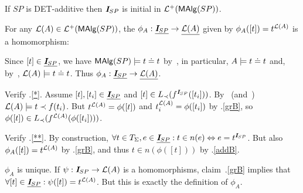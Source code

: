 \documentclass[12pt]{article}
\begin{document}
\begin{Prop}
If $SP$ is DET-additive then $\mbox{\bf{\em I}}_{SP}$ is initial in ${\cal L}^+({\sf MAlg}(SP))$.
\end{Prop}
\begin{Proof}
For any ${\cal L}(A)\in{\cal L}^+({\sf MAlg}(SP))$, the $\phi_A: \underline {\mbox{\bf{\em I}}_{SP}}\rightarrow \underline {{\cal L}(A)}$ given by $\phi_A([t]) = t^{{\cal L}(A)}$ is a homomorphism:
\begin{enum}
\item
Since $[t]\in\underline {\mbox{\bf{\em I}}_{SP}}$, we have ${\sf MAlg}(SP)\models t\mathrel{\dot{=} } t$ by~, in
particular, $A\models t\mathrel{\dot{=} } t$ and, by~, ${\cal L}(A)\models
t\mathrel{\dot{=} } t$. Thus $\phi_A:\underline {\mbox{\bf{\em I}}_{SP}}\rightarrow \underline {{\cal L}(A)}$.
\item
Verify .\ref{*}. Assume $[t],[t_i]\in\underline {\mbox{\bf{\em I}}_{SP}}$ and
$[t]\in L_{\prec}(f^{{\scriptsize{\mbox{\bf{\em I}}}}_{SP}}([t_i]))$. By~ (and~)
${\cal L}(A)\models t\prec f(t_i)$. But $t^{{\cal L}(A)}= \phi([t])$ and $t_i^{{\cal L}(A)}= \phi([t_i])$ by .\ref{grB}, so $\phi([t])\in L_{\prec}(f^{{\cal L}(A)}(\phi([t_i])))$. 
\item
Verify .\ref{**}. By construction, $\forall t\in T_{\Sigma}, e\in
\underline {\mbox{\bf{\em I}}_{SP}}: t\in n(e) \Leftrightarrow e = t^{{\scriptsize{\mbox{\bf{\em I}}}}_{SP}}$. But also
$\phi_A([t]) = t^{{\cal L}(A)}$ by .\ref{grB}, and thus $t\in
n(\phi([t]))$ by .\ref{addB}.
\end{enum}
$\phi_A$ is unique. If $\psi:\mbox{\bf{\em I}}_{SP}\rightarrow {\cal L}(A)$ is a homomorphisms,
claim~.\ref{grB} implies that $\forall [t]\in\underline {\mbox{\bf{\em I}}_{SP}}:
\psi([t]) = t^{{\cal L}(A)}$. But this is exactly the definition of $\phi_A$.
\end{Proof}

%


%
%
\end{document}
